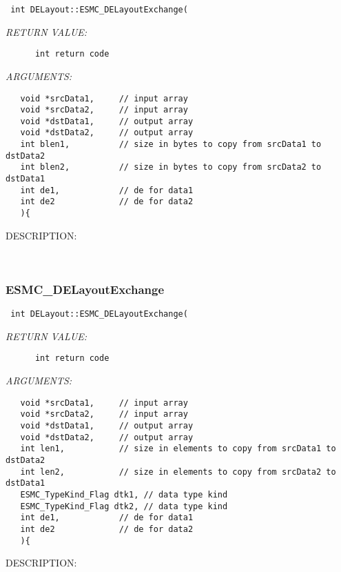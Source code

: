   
\begin{verbatim} int DELayout::ESMC_DELayoutExchange(\end{verbatim}{\em RETURN VALUE:}
\begin{verbatim}      int return code\end{verbatim}{\em ARGUMENTS:}
\begin{verbatim}   void *srcData1,     // input array
   void *srcData2,     // input array
   void *dstData1,     // output array
   void *dstData2,     // output array
   int blen1,          // size in bytes to copy from srcData1 to dstData2
   int blen2,          // size in bytes to copy from srcData2 to dstData1
   int de1,            // de for data1
   int de2             // de for data2
   ){\end{verbatim}
{\sf DESCRIPTION:\\ }


   
 
\mbox{}\hrulefill\
 
\subsubsection [ESMC\_DELayoutExchange] {ESMC\_DELayoutExchange}


  
\begin{verbatim} int DELayout::ESMC_DELayoutExchange(\end{verbatim}{\em RETURN VALUE:}
\begin{verbatim}      int return code\end{verbatim}{\em ARGUMENTS:}
\begin{verbatim}   void *srcData1,     // input array
   void *srcData2,     // input array
   void *dstData1,     // output array
   void *dstData2,     // output array
   int len1,           // size in elements to copy from srcData1 to dstData2
   int len2,           // size in elements to copy from srcData2 to dstData1
   ESMC_TypeKind_Flag dtk1, // data type kind
   ESMC_TypeKind_Flag dtk2, // data type kind
   int de1,            // de for data1
   int de2             // de for data2
   ){\end{verbatim}
{\sf DESCRIPTION:\\ }


   
 
